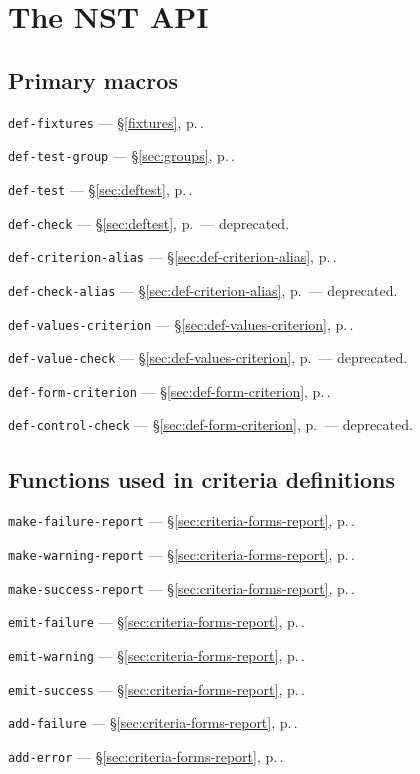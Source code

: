 
\section{The NST API}
\def\secpageref#1{ --- \S\ref{#1}, p.\,\pageref{#1}}

\subsection{Primary macros}
\texttt{def-fixtures}\secpageref{fixtures}.

\texttt{def-test-group}\secpageref{sec:groups}.

\texttt{def-test}\secpageref{sec:deftest}.

\texttt{def-check}\secpageref{sec:deftest} --- deprecated.

\texttt{def-criterion-alias}\secpageref{sec:def-criterion-alias}.

\texttt{def-check-alias}\secpageref{sec:def-criterion-alias} ---
deprecated.

\texttt{def-values-criterion}\secpageref{sec:def-values-criterion}.

\texttt{def-value-check}\secpageref{sec:def-values-criterion} ---
deprecated.

\texttt{def-form-criterion}\secpageref{sec:def-form-criterion}.

\texttt{def-control-check}\secpageref{sec:def-form-criterion} ---
deprecated.

\subsection{Functions used in criteria definitions}

\texttt{make-failure-report}\secpageref{sec:criteria-forms-report}.

\texttt{make-warning-report}\secpageref{sec:criteria-forms-report}.

\texttt{make-success-report}\secpageref{sec:criteria-forms-report}.

\texttt{emit-failure}\secpageref{sec:criteria-forms-report}.

\texttt{emit-warning}\secpageref{sec:criteria-forms-report}.

\texttt{emit-success}\secpageref{sec:criteria-forms-report}.

\texttt{add-failure}\secpageref{sec:criteria-forms-report}.

\texttt{add-error}\secpageref{sec:criteria-forms-report}.

